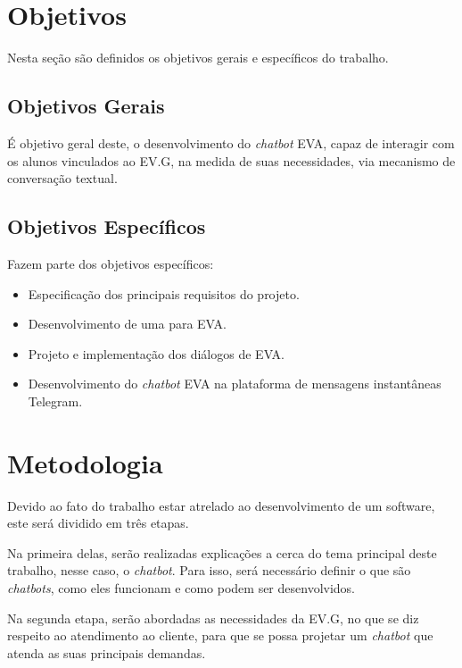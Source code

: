 \section{Objetivos}\label{cap:01:sec:01:objetivos}

Nesta seção são definidos os objetivos gerais e específicos do trabalho.


\subsection{Objetivos Gerais}\label{cap:01:sec:01:sub:01:objetivo-geral}

É objetivo geral deste, o desenvolvimento do \textit{chatbot} EVA, capaz de interagir com os alunos vinculados ao EV.G, na medida de suas necessidades, via mecanismo de conversação textual.


\subsection{Objetivos Específicos}\label{cap:01:sec:01:sub:02:ojetivos-especificos}

Fazem parte dos objetivos específicos:

\begin{itemize}
    \item Especificação dos principais requisitos do projeto.
    \item Desenvolvimento de uma  para EVA.
    \item Projeto e implementação dos diálogos de EVA.
    \item Desenvolvimento do \textit{chatbot} EVA na plataforma de mensagens instantâneas Telegram.
\end{itemize}


\section{Metodologia}\label{cap:01:sec:02:metodologia}

Devido ao fato do trabalho estar atrelado ao desenvolvimento de um software, este será dividido em três etapas. 

Na primeira delas, serão realizadas explicações a cerca do tema principal deste trabalho, nesse caso, o \textit{chatbot}. Para isso, será necessário definir o que são \textit{chatbots}, como eles funcionam e como podem ser desenvolvidos.

Na segunda etapa, serão abordadas as necessidades da EV.G, no que se diz respeito ao atendimento ao cliente, para que se possa projetar um \textit{chatbot} que atenda as suas principais demandas.

